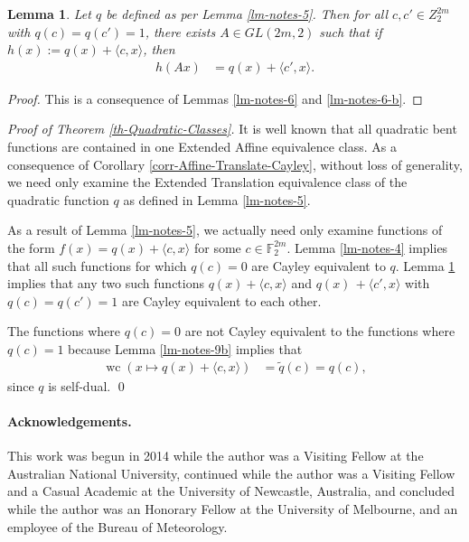 \documentclass[12pt,a4paper]{article}
\newcommand{\mb}[1]{\mathbb{#1}}
\newcommand{\F}{\mb{F}}
\newcommand{\dual}[1]{\widetilde{#1}}
\newcommand{\weightclass}[1]{\operatorname{wc}\left(#1\right)}
\newtheorem{Lemma}{Lemma}
\newenvironment{proofof}[1]{\noindent\emph{Proof of #1.}}{\qed}
\begin{document}
\begin{Lemma}
\label{lm-notes-7}
Let $q$ be defined as per Lemma \ref{lm-notes-5}.
Then for all $c, c' \in Z_2^{2 m}$ with $q(c)=q(c')=1$, there exists $A \in GL(2 m, 2)$ such that
if $h(x) := q(x) + \langle c, x \rangle$, then
\begin{align*}
h(A x) &= q(x) + \langle c', x \rangle.
\end{align*}
\end{Lemma}

\begin{proof}
This is a consequence of Lemmas \ref{lm-notes-6} and \ref{lm-notes-6-b}.
\end{proof}

\begin{proofof}{Theorem \ref{th-Quadratic-Classes}}
It is well known that all quadratic bent functions are contained in one Extended Affine equivalence
class.
As a consequence of Corollary \ref{corr-Affine-Translate-Cayley}, without loss of generality, we need
only examine
the Extended Translation equivalence class of the quadratic function $q$ as defined in Lemma
\ref{lm-notes-5}.

As a result of Lemma \ref{lm-notes-5}, we actually need only examine functions of the form
$f(x) = q(x) + \langle c,x \rangle$
for some $c \in \F_2^{2m}$.
Lemma \ref{lm-notes-4} implies that all such functions for which $q(c)=0$ are Cayley equivalent to
$q$.
Lemma \ref{lm-notes-7} implies that any two such functions $q(x) + \langle c, x \rangle$ and $q(x)\, +
\langle c', x \rangle$
with $q(c)=q(c')=1$ are Cayley equivalent to each other.

The functions where $q(c)=0$ are not Cayley equivalent to the functions where $q(c)=1$ because
Lemma \ref{lm-notes-9b} implies that
\begin{align*}
\weightclass{x \mapsto q(x) + \langle c,x \rangle}
&=
\dual{q}(c) = q(c),
\end{align*}
since $q$ is self-dual.
\end{proofof}

\paragraph*{Acknowledgements.}
\small{}
This work was begun in 2014 while the author was a Visiting Fellow at the Australian National University,
continued while the author was a Visiting Fellow and a Casual Academic at the University of Newcastle, Australia,
and concluded while the author was an Honorary Fellow at the University of Melbourne,
and an employee of the Bureau of Meteorology.
\end{document}
